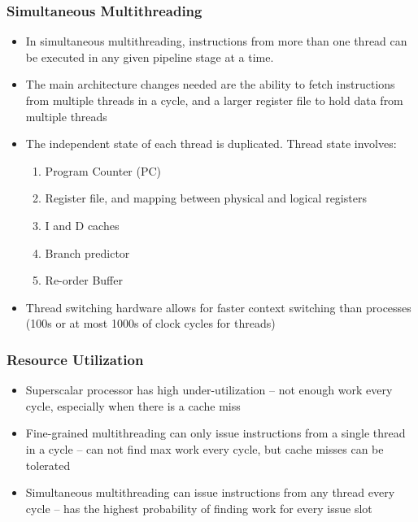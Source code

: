 \documentclass{article}
\begin{document}
\subsubsection{Simultaneous Multithreading}
\begin{itemize}
    \item  In simultaneous multithreading, instructions from more than one thread can be executed in any given pipeline stage at a time.
    
    \item The main architecture changes needed are the ability to fetch instructions from multiple threads in a cycle, and a larger register file to hold data from multiple threads
    
    \item The independent state of each thread is duplicated. Thread state involves:
    \begin{enumerate}
        \item Program Counter (PC)
        
        \item Register file, and mapping between physical and logical registers
        
        \item I and D caches
        
        \item Branch predictor
        
        \item Re-order Buffer
    \end{enumerate}
    
    \item Thread switching hardware allows for faster context switching than processes (100s or at most 1000s of clock cycles for threads)
\end{itemize}

\subsubsection{Resource Utilization}
\begin{itemize}
    \item Superscalar processor has high under-utilization – not enough work every cycle, especially when there is a cache miss
    
    \item Fine-grained multithreading can only issue instructions from a single thread in a cycle – can not find max work every cycle, but cache misses can be tolerated
    
    \item  Simultaneous multithreading can issue instructions from any thread every cycle – has the highest probability of finding work for every issue slot
\end{itemize}
\end{document}

